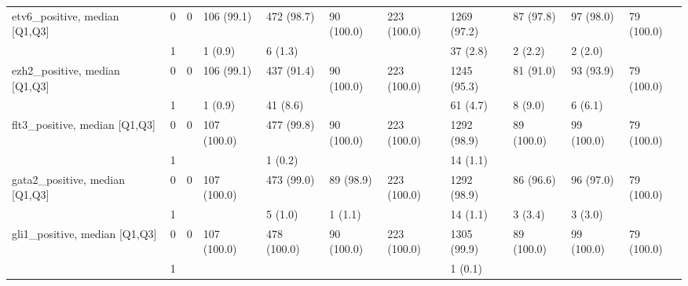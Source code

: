 \begin{tabular}{lllllllllll}
etv6\_positive, median [Q1,Q3] & 0 &                    0 &          106 (99.1) &         472 (98.7) &           90 (100.0) &         223 (100.0) &       1269 (97.2) &         87 (97.8) &           97 (98.0) &           79 (100.0) \\
                 & 1 &                      &             1 (0.9) &            6 (1.3) &                      &                     &          37 (2.8) &           2 (2.2) &             2 (2.0) &                      \\
ezh2\_positive, median [Q1,Q3] & 0 &                    0 &          106 (99.1) &         437 (91.4) &           90 (100.0) &         223 (100.0) &       1245 (95.3) &         81 (91.0) &           93 (93.9) &           79 (100.0) \\
                 & 1 &                      &             1 (0.9) &           41 (8.6) &                      &                     &          61 (4.7) &           8 (9.0) &             6 (6.1) &                      \\
flt3\_positive, median [Q1,Q3] & 0 &                    0 &         107 (100.0) &         477 (99.8) &           90 (100.0) &         223 (100.0) &       1292 (98.9) &        89 (100.0) &          99 (100.0) &           79 (100.0) \\
                 & 1 &                      &                     &            1 (0.2) &                      &                     &          14 (1.1) &                   &                     &                      \\
gata2\_positive, median [Q1,Q3] & 0 &                    0 &         107 (100.0) &         473 (99.0) &            89 (98.9) &         223 (100.0) &       1292 (98.9) &         86 (96.6) &           96 (97.0) &           79 (100.0) \\
                 & 1 &                      &                     &            5 (1.0) &              1 (1.1) &                     &          14 (1.1) &           3 (3.4) &             3 (3.0) &                      \\
gli1\_positive, median [Q1,Q3] & 0 &                    0 &         107 (100.0) &        478 (100.0) &           90 (100.0) &         223 (100.0) &       1305 (99.9) &        89 (100.0) &          99 (100.0) &           79 (100.0) \\
                 & 1 &                      &                     &                    &                      &                     &           1 (0.1) &                   &                     &                      \\

\end{tabular}
